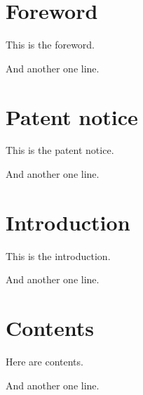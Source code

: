 \documentclass{IsoStandardDocument}
\begin{document}
  \section*{Foreword}

  This is the foreword.

  And another one line.

  \section*{Patent notice}

  This is the patent notice.

  And another one line.

  \section*{Introduction}

  This is the introduction.

  And another one line.

  \section{Contents}

  Here are contents.

  And another one line.
\end{document}
